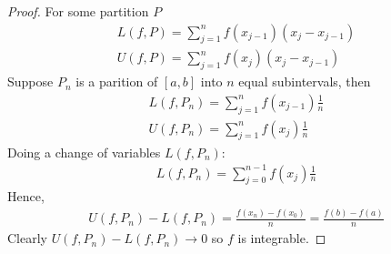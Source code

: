
\begin{proof}
    For some partition $P$ 
    \begin{gather*}
        L(f,P) = \sum_{j=1}^n f(x_{j-1})(x_j - x_{j-1}) \\
        U(f,P) = \sum_{j=1}^n f(x_{j})(x_j - x_{j-1})
    \end{gather*}
    Suppose $P_n$ is a parition of $[a,b]$ into $n$ equal subintervals, 
    then 
    \begin{gather*}
        L(f,P_n) = \sum_{j=1}^n f(x_{j-1})\frac{1}{n} \\
        U(f,P_n) = \sum_{j=1}^n f(x_{j})\frac{1}{n}
    \end{gather*}
    Doing a change of variables $L(f,P_n)$:
    \begin{gather*}
        L(f,P_n) = \sum_{j=0}^{n-1} f(x_{j})\frac{1}{n}
    \end{gather*}
    Hence, 
    \begin{align*}
        U(f,P_n) - L(f,P_n) = \frac{f(x_n) - f(x_0)}{n} = \frac{f(b) - f(a)}{n}
    \end{align*}
    Clearly $U(f,P_n) - L(f,P_n) \rightarrow 0$ so $f$ is integrable.
\end{proof}